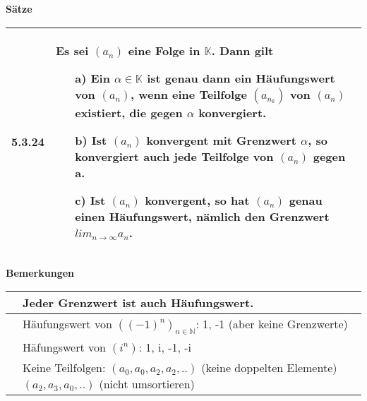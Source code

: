     \noindent 
    \textbf{Sätze}
    \begin{table}[H]
    \begin{tabularx}{\textwidth}{X m{16cm}}
        \toprule

        5.3.24& Es sei $(a_n)$ eine Folge in $\mathbb{K}$. Dann gilt \hfill \break
                \begin{itemize}[topsep=-0.5cm]
                    \item[a)] Ein $\alpha \in \mathbb{K}$ ist genau dann ein Häufungswert von $(a_n)$, wenn eine Teilfolge $(a_{n_k})$ von
                                $(a_n)$ existiert, die gegen $\alpha$ konvergiert.
                    \item[b)] Ist $(a_n)$ konvergent mit Grenzwert $\alpha$, so konvergiert auch jede Teilfolge von $(a_n)$ gegen a.
                    \item[c)] Ist $(a_n)$ konvergent, so hat $(a_n)$ genau einen Häufungswert, nämlich den Grenzwert 
                                $lim_{n \rightarrow \infty} a_n$.
                \end{itemize} \vspace{-0cm} \\

        \bottomrule
    \end{tabularx}
    \end{table}

    \noindent
    \textbf{Bemerkungen}
    \begin{table}[H]
    \begin{tabularx}{\textwidth}{X m{16cm}}
        \toprule

        & Jeder Grenzwert ist auch Häufungswert. \\
        \midrule
        & Häufungswert von $((-1)^n)_{n \in \mathbb{N}}$: 1, -1 (aber keine Grenzwerte) \\
        \midrule
        & Häfungswert von $(i^n)$: 1, i, -1, -i \\
        \midrule
        & Keine Teilfolgen: \hfill \break
            $(a_0, a_0, a_2, a_2,..)$ (keine doppelten Elemente) \hfill \break
            $(a_2, a_3, a_0,..)$ (nicht umsortieren) \\


        \bottomrule
    \end{tabularx}
    \end{table}

